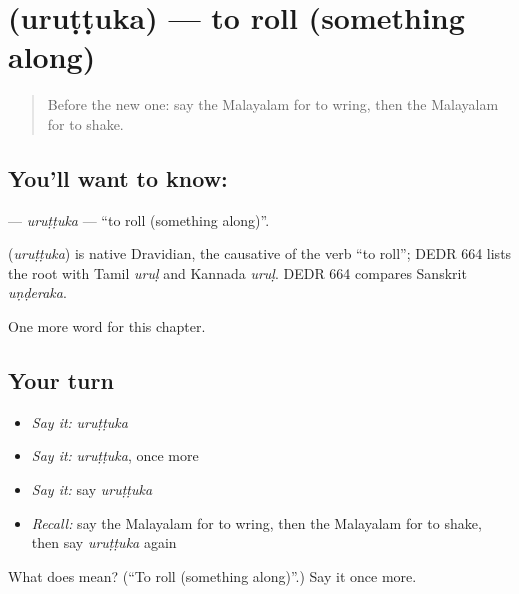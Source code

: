 \section[\texorpdfstring{\ml{ഉരുട്ടുക} (uruṭṭuka)}{ഉരുട്ടുക (uruṭṭuka)}]{ (uruṭṭuka) — to roll (something along)}

\label{lesson:ML-C189-uruttuka}



\begin{quote}
Before the new one: say the Malayalam for to wring, then the Malayalam for to shake.
\end{quote}

\subsection*{You'll want to know: }
\textbf{} — \emph{uruṭṭuka} — \textquotedblleft{}to roll (something along)\textquotedblright{}.

\begin{cousinweb}
\textbf{} (\emph{uruṭṭuka}) is native Dravidian, the causative of the verb \textquotedblleft{}to roll\textquotedblright{}; DEDR 664 lists the root with Tamil \emph{uruḷ} and Kannada \emph{uruḷ}. DEDR 664 compares Sanskrit \emph{uṇḍeraka}.
\end{cousinweb}

\begin{grammarlens}[title={What you've built}]
One more word for this chapter.
\end{grammarlens}

\subsection*{Your turn}
\begin{itemize}
\raggedright
  \item \emph{Say it:} \emph{uruṭṭuka}
  \item \emph{Say it:} \emph{uruṭṭuka}, once more
  \item \emph{Say it:} say \emph{uruṭṭuka}
  \item \emph{Recall:} say the Malayalam for to wring, then the Malayalam for to shake, then say \emph{uruṭṭuka} again
\end{itemize}

\begin{tcolorbox}[breakable,colback=teal!4,colframe=teal!35!black,title={Before you move on}]
What does  mean? (\textquotedblleft{}To roll (something along)\textquotedblright{}.) Say it once more.
\end{tcolorbox}
